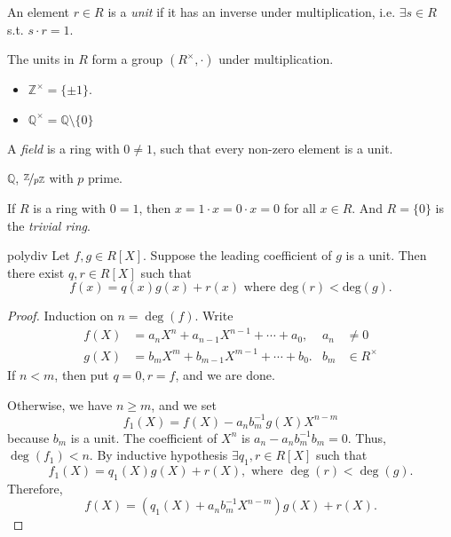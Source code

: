 \begin{definition}{}{}
    An element \(r \in R\) is a \textit{unit}  if it has an inverse under multiplication, i.e. \(\exists s \in R\) s.t. \(s \cdot r = 1\).
\end{definition}
The units in \(R\) form a group \((R^{\times}, \cdot)\) under multiplication.
\begin{example}
    \leavevmode
    \begin{itemize}
    \item \(\mathbb{Z}^\times = \{\pm 1\}\).
    \item \(\mathbb{Q}^\times = \mathbb{Q}\setminus \{0\}\) 
    \end{itemize}
\end{example}
\begin{definition}{}{}
    A \textit{field} is a ring with \(0 \neq 1\), such that every non-zero element is a unit.
\end{definition}
\begin{example}
    \(\mathbb{Q}\), \(\nicefrac{\mathbb{Z}}{p\mathbb{Z}}\) with \(p\) prime.
\end{example}
\begin{remark}
    If \(R\) is a ring with \(0 = 1\), then \(x = 1\cdot x = 0 \cdot x = 0\) for all \(x \in R\). And \(R = \{0\}\) is the \textit{trivial ring}.
\end{remark}
\begin{proposition}{}{polydiv}
    Let \(f, g \in R[X]\). Suppose the leading coefficient of \(g\) is a unit. Then there exist \(q, r \in R[X]\) such that
    \[
        f(x) = q(x)g(x) + r(x) \text{ where \(\mathrm{deg}(r) < \mathrm{deg}(g)\)}.
    \]
\end{proposition}
\begin{proof}
    Induction on \(n = \deg(f)\). Write
    \begin{align*}
        f(X) &= a_n X^n + a_{n - 1}X^{n - 1} + \cdots + a_0, &a_n &\neq 0\\
        g(X) &= b_m X^m + b_{m - 1}X^{m - 1} + \cdots + b_0. &b_m &\in R^\times
    \end{align*}
    If \(n < m\), then put \(q = 0, r = f\), and we are done.

    Otherwise, we have \(n \geq m\), and we set
    \[
        f_1(X) = f(X) - a_n b_m^{-1}g(X)X^{n - m}
    \]
    because \(b_m\) is a unit. The coefficient of \(X^n\) is \(a_n - a_n b_m^{-1} b_m = 0\). Thus, \(\deg(f_1) < n\). By inductive hypothesis \(\exists q_1, r \in R[X]\) such that
    \[
        f_1(X) = q_1(X)g(X) + r(X), \text{ where } \deg(r) < \deg(g).
    \]
    Therefore,
    \[
        f(X) = (q_1(X) + a_n b_m^{-1}X^{n-m})g(X) + r(X).
    \]
\end{proof}
